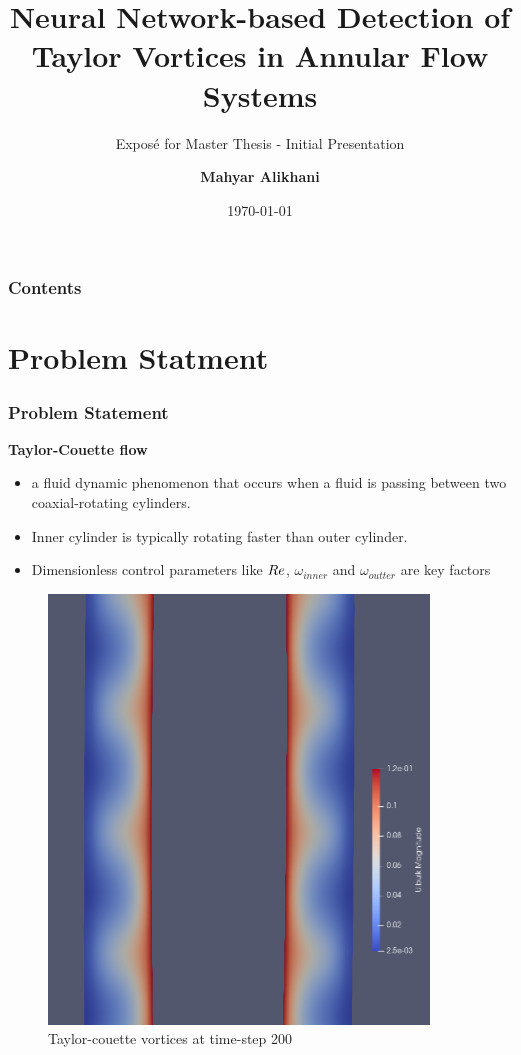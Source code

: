 \documentclass[aspectratio=169]{beamer}
\title{Neural Network-based Detection of Taylor Vortices in Annular Flow Systems}
\subtitle{Exposé for Master Thesis - Initial Presentation}
\author{\textbf{Mahyar Alikhani}}
\institute{Institute of Applied Mechanics}
\date{\today}
\begin{document}
\begin{frame}
\titlepage
\end{frame}

\begin{frame}
\frametitle{Contents}
\tableofcontents
\end{frame}

\section{Problem Statment}
\begin{frame}
  \frametitle{Problem Statement}
  \begin{minipage}{0.45\textwidth}
    \large \color{TUCgreen}\textbf{Taylor-Couette flow}
    \begin{itemize}
      \item a fluid dynamic phenomenon that occurs when a fluid is passing between two coaxial-rotating cylinders.
      \item Inner cylinder is typically rotating faster than outer cylinder.
      \item Dimensionless control parameters like \(\mathnormal{Re}\), $\omega_{inner}$ and $\omega_{outter}$  are key factors
    \end{itemize}
  \end{minipage}
  \begin{minipage}{0.45\textwidth}
    \vspace{-1.0 cm}
    \centering
    \begin{figure}[h]
      \includegraphics[width=0.9\textwidth]{Taylor_merve_vortex.png}
      \caption{\tiny{Taylor-couette vortices at time-step 200}}
    \end{figure}
  \end{minipage}
\end{frame}
\end{document}
